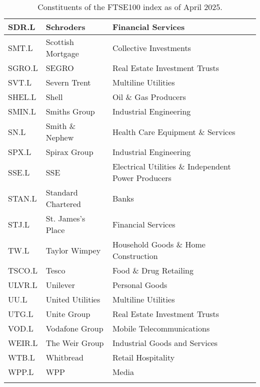 \begin{longtable}{|p{2cm}|p{4cm}|p{6cm}|}
SDR.L & Schroders & Financial Services \\ \hline
SMT.L & Scottish Mortgage & Collective Investments \\ \hline
SGRO.L & SEGRO & Real Estate Investment Trusts \\ \hline
SVT.L & Severn Trent & Multiline Utilities \\ \hline
SHEL.L & Shell & Oil \& Gas Producers \\ \hline
SMIN.L & Smiths Group & Industrial Engineering \\ \hline
SN.L & Smith \& Nephew & Health Care Equipment \& Services \\ \hline
SPX.L & Spirax Group & Industrial Engineering \\ \hline
SSE.L & SSE & Electrical Utilities \& Independent Power Producers \\ \hline
STAN.L & Standard Chartered & Banks \\ \hline
STJ.L & St. James's Place & Financial Services \\ \hline
TW.L & Taylor Wimpey & Household Goods \& Home Construction \\ \hline
TSCO.L & Tesco & Food \& Drug Retailing \\ \hline
ULVR.L & Unilever & Personal Goods \\ \hline
UU.L & United Utilities &  Multiline Utilities \\ \hline
UTG.L & Unite Group & Real Estate Investment Trusts \\ \hline
VOD.L & Vodafone Group & Mobile Telecommunications \\ \hline
WEIR.L & The Weir Group & Industrial Goods and Services \\ \hline
WTB.L & Whitbread & Retail Hospitality \\ \hline
WPP.L & WPP & Media \\ \hline
\caption{Constituents of the FTSE100 index as of April 2025. \cite{WikipediaFtse100}}
\label{tab:ftse100constituents}
\end{longtable}
